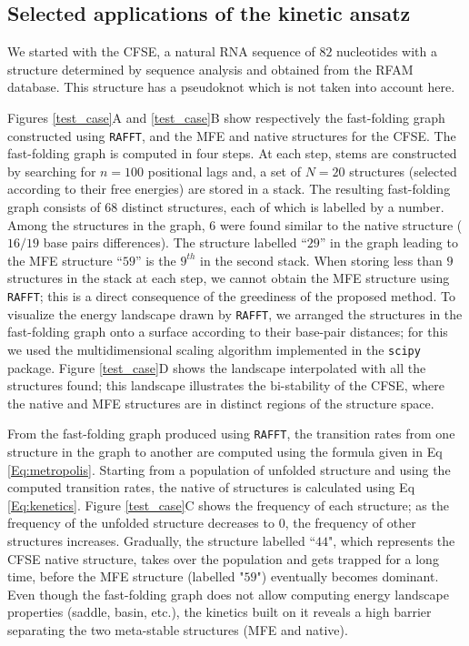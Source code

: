\subsection{Selected applications of the kinetic ansatz}
We started with the CFSE, a natural RNA sequence of $82$ nucleotides with a structure determined by sequence analysis and obtained from the RFAM database. This structure has a pseudoknot which is not taken into account here.

Figures \ref{test_case}A and \ref{test_case}B show respectively the fast-folding graph constructed using \texttt{RAFFT}, and the MFE and native structures for the CFSE. The fast-folding graph is computed in four steps. At each step, stems are constructed by searching for $n=100$ positional lags and, a set of $N=20$ structures (selected according to their free energies) are stored in a stack. The resulting fast-folding graph consists of $68$ distinct structures, each of which is labelled by a number. Among the structures in the graph, $6$ were found similar to the native structure ($16/19$ base pairs differences). The structure labelled ``$29$'' in the graph leading to the MFE structure ``$59$'' is the $9^{th}$ in the second stack. When storing less than $9$ structures in the stack at each step, we cannot obtain the MFE structure using \texttt{RAFFT}; this is a direct consequence of the greediness of the proposed method. To visualize the energy landscape drawn by \texttt{RAFFT}, we arranged the structures in the fast-folding graph onto a surface according to their base-pair distances; for this we used the multidimensional scaling algorithm implemented in the \texttt{scipy} package.  Figure \ref{test_case}D shows the landscape interpolated with all the structures found; this landscape illustrates the bi-stability of the CFSE, where the native and MFE structures are in distinct regions of the structure space.

From the fast-folding graph produced using \texttt{RAFFT}, the transition rates from one structure in the graph to another are computed using the formula given in Eq \ref{Eq:metropolis}. Starting from a population of unfolded structure and using the computed transition rates, the native of structures is calculated using Eq \ref{Eq:kenetics}. Figure \ref{test_case}C shows the frequency of each structure; as the frequency of the unfolded structure decreases to $0$, the frequency of other structures increases. Gradually, the structure labelled ``$44$", which represents the CFSE native structure, takes over the population and gets trapped for a long time, before the MFE structure (labelled "$59$") eventually becomes dominant. Even though the fast-folding graph does not allow computing energy landscape properties (saddle, basin, etc.), the kinetics built on it reveals a high barrier separating the two meta-stable structures (MFE and native). 

